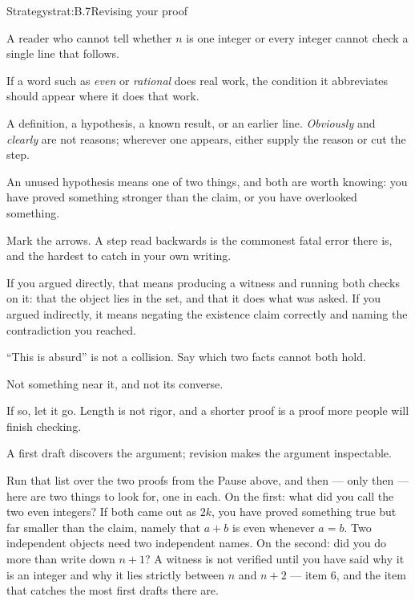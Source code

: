 \documentclass[a4paper,12pt,oneside]{memoir}
\begin{document}
\begin{envstrategy}{Strategy}{strat:B.7}{Revising your proof}
\begin{steps}
  \item {} A reader who cannot tell whether \(n\) is one integer or every integer cannot check a single line that follows.
  \item {} If a word such as \emph{even} or \emph{rational} does real work, the condition it abbreviates should appear where it does that work.
  \item {} A definition, a hypothesis, a known result, or an earlier line. \emph{Obviously} and \emph{clearly} are not reasons; wherever one appears, either supply the reason or cut the step.
  \item {} An unused hypothesis means one of two things, and both are worth knowing: you have proved something stronger than the claim, or you have overlooked something.
  \item {} Mark the arrows. A step read backwards is the commonest fatal error there is, and the hardest to catch in your own writing.
  \item {} If you argued directly, that means producing a witness and running both checks on it: that the object lies in the set, and that it does what was asked. If you argued indirectly, it means negating the existence claim correctly and naming the contradiction you reached.
  \item {} “This is absurd” is not a collision. Say which two facts cannot both hold.
  \item {} Not something near it, and not its converse.
  \item {} If so, let it go. Length is not rigor, and a shorter proof is a proof more people will finish checking.
\end{steps}
\begin{informal}
A first draft discovers the argument; revision makes the argument inspectable.
\end{informal}
\end{envstrategy}
Run that list over the two proofs from the Pause above, and then — only then — here are two things to look for, one in each. On the first: what did you call the two even integers? If both came out as \(2k\), you have proved something true but far smaller than the claim, namely that \(a + b\) is even whenever \(a = b\). Two independent objects need two independent names. On the second: did you do more than write down \(n + 1\)? A witness is not verified until you have said why it is an integer and why it lies strictly between \(n\) and \(n + 2\) — item 6, and the item that catches the most first drafts there are.
\end{document}

